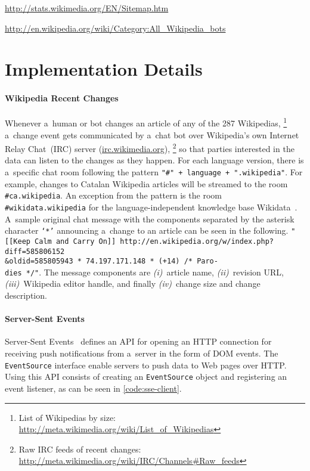 \documentclass{sig-alternate}
\newcommand{\inlinelistingsize}{\fontsize{8pt}{11pt}}
\let\oldurl\url
\renewcommand{\url}[1]{\inlinelistingsize\oldurl{#1}}
\begin{document}
\url{http://stats.wikimedia.org/EN/Sitemap.htm}

\url{http://en.wikipedia.org/wiki/Category:All_Wikipedia_bots}

\section{Implementation Details}

\paragraph{Wikipedia Recent Changes}

Whenever a~human or bot changes an article
of any of the 287 Wikipedias,%
\footnote{List of Wikipedias by size:
\url{http://meta.wikimedia.org/wiki/List_of_Wikipedias}}
a~change event gets communicated by a~chat bot
over Wikipedia's own Internet Relay Chat~(IRC) server (\url{irc.wikimedia.org}),%
\footnote{Raw IRC feeds of recent changes:
\url{http://meta.wikimedia.org/wiki/IRC/Channels\#Raw_feeds}}
so that parties interested in the data
can listen to the changes as they happen.
For each language version, there is
a~specific chat room following the pattern
\texttt{"\#" + language + ".wikipedia"}.
For example, changes to Catalan Wikipedia articles
will be streamed to the room \texttt{\#ca.wikipedia}.
An exception from the pattern is the room
\texttt{\#wikidata.wikipedia} for the language-independent
knowledge base Wikidata~\cite{vrandecic2012wikidata}.
A~sample original chat message with the components separated
by the asterisk character \texttt{`*'}
announcing a~change to an article
can be seen in the following.
\texttt{"[[Keep Calm and Carry On]] http://en.wikipedia.org/w/index.php?diff=585806152\\ \&oldid=585805943 * 74.197.171.148 * (+14) /* Paro-\\ dies */"}.
The message components are \emph{(i)}~article name, \emph{(ii)}~revision URL,
\emph{(iii)}~Wikipedia editor handle, and finally
\emph{(iv)}~change size and change description.

\paragraph{Server-Sent Events}
Server-Sent Events~\cite{hickson2012sse}
defines an API for opening an HTTP connection
for receiving push notifications from a~server
in the form of DOM events.
The \texttt{EventSource} interface enable servers
to push data to Web pages over HTTP.
Using this API consists of creating
an \texttt{EventSource} object and registering an event listener,
as can be seen in \autoref{code:sse-client}.
\end{document}
